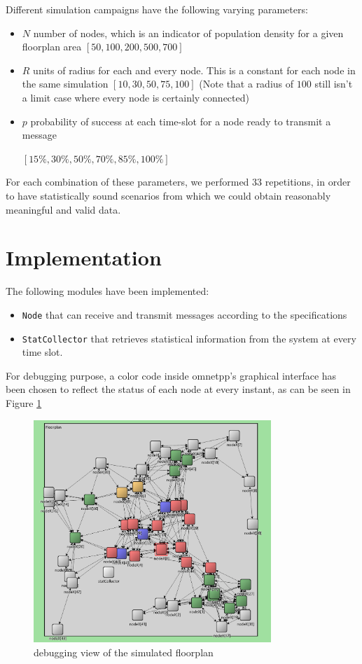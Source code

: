 Different simulation campaigns have the following varying parameters:
\begin{itemize}
\item $N$ number of nodes, which is an indicator of population density for a given floorplan area $[50, 100, 200, 500, 700]$
\item $R$ units of radius for each and every node. This is a constant for each node in the same simulation $[10, 30, 50, 75, 100]$ (Note that a radius of $100$ still isn't a limit case where every node is certainly connected)
\item $p$ probability of success at each time-slot for a node ready to transmit a message 

$[15\%, 30\%, 50\%, 70\%, 85\%, 100\%]$
\end{itemize}
For each combination of these parameters, we performed $33$ repetitions, in order to have statistically sound scenarios from which we could obtain reasonably meaningful and valid data.
\section{Implementation}
The following modules have been implemented:
\begin{itemize}
\item \texttt{Node} that can receive and transmit messages according to the specifications
\item \texttt{StatCollector} that retrieves statistical information from the system at every time slot.
\end{itemize}
For debugging purpose, a color code inside omnetpp's graphical interface has been chosen to reflect the status of each node at every instant, as can be seen in Figure \ref{fig:floorplan}

\begin{figure}
\centering
\includegraphics[width=0.8\textwidth]{./images/floorplan3.png}
\caption{debugging view of the simulated floorplan}
\label{fig:floorplan}
\end{figure}

